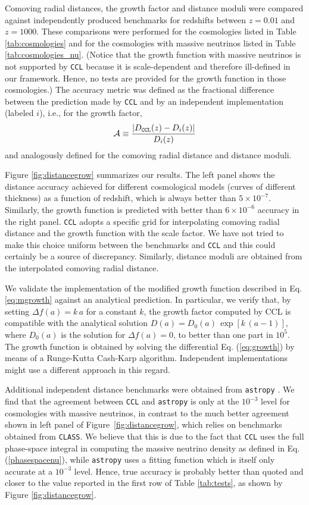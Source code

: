 \documentclass[\docopts]{\docclass}
\newcommand{\ccl}{{\tt CCL}\xspace}
\begin{document}
Comoving radial distances, the growth factor and distance moduli were compared against independently produced benchmarks for redshifts between $z = 0.01$ and $z = 1000$. These comparisons were performed for the cosmologies listed in Table \ref{tab:cosmologies} and for the cosmologies with massive neutrinos listed in Table \ref{tab:cosmologies_nu}. (Notice that the growth function with massive neutrinos is not supported by \ccl because it is scale-dependent and therefore ill-defined in our framework. Hence, no tests are provided for the growth function in those cosmologies.) The accuracy metric was defined as the fractional difference between the prediction made by \ccl and by an independent implementation (labeled $i$), i.e., for the growth factor,
\begin{equation}
  \mathcal{A} \equiv \frac{|D_{\tt CCL}(z)-D_{i}(z)|}{D_i(z)}
\end{equation}
and analogously defined for the comoving radial distance and distance moduli.

Figure \ref{fig:distancegrow} summarizes our results. The left panel shows the distance accuracy achieved for different cosmological models (curves of different thickness) as a function of redshift, which is always better than $5\times 10^{-7}$. Similarly, the growth function is predicted with better than $6\times 10^{-6}$ accuracy in the right panel. \ccl adopts a specific grid for interpolating comoving radial distance and the growth function with the scale factor. We have not tried to make this choice uniform between the benchmarks and \ccl and this could certainly be a source of discrepancy. Similarly, distance moduli are obtained from the interpolated comoving radial distance.

We validate the implementation of the modified growth function described in Eq. \ref{eq:mgrowth} against an analytical prediction. In particular, we verify that, by setting $\Delta f(a)=k\,a$ for a constant $k$, the growth factor computed by CCL is compatible with the analytical solution $D(a)=D_0(a)\,\exp[k\,(a-1)]$, where $D_0(a)$ is the solution for $\Delta f(a)=0$, to better than one part in $10^{5}$. The growth function is obtained by solving the differential Eq. (\ref{eq:growth}) by means of a Runge-Kutta Cash-Karp algorithm. Independent implementations might use a different approach in this regard.

Additional independent distance benchmarks were obtained from {\tt astropy} \citep{astropy}. We find that the agreement between \ccl and {\tt astropy} is only at the $10^{-3}$ level for cosmologies with massive neutrinos, in contrast to the much better agreement shown in left panel of Figure~\ref{fig:distancegrow}, which relies on benchmarks obtained from {\tt CLASS}. We believe that this is due to the fact that \ccl uses the full phase-space integral in computing the massive neutrino density as defined in Eq. (\ref{phasespacenu}), while {\tt astropy} uses a fitting function which is itself only accurate at a $10^{-3}$ level. Hence, true accuracy is probably better than quoted and closer to the value reported in the first row of Table \ref{tab:tests}, as shown by Figure \ref{fig:distancegrow}.
\end{document}
